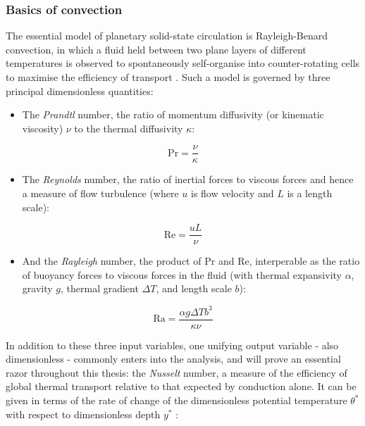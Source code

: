 \documentclass[a4paper,11pt,oneside]{book}
\begin{document}
\subsubsection{Basics of convection}

The essential model of planetary solid-state circulation is Rayleigh-Benard convection, in which a fluid held between two plane layers of different temperatures is observed to spontaneously self-organise into counter-rotating cells to maximise the efficiency of transport \cite{Getling1998-gv}. Such a model is governed by three principal dimensionless quantities:

\begin{itemize}
\item The \textit{Prandtl} number, the ratio of momentum diffusivity (or kinematic viscosity) $\nu$ to the thermal diffusivity $\kappa$:
\end{itemize}

\begin{equation}
\mathrm{Pr} = \frac{\nu}{\kappa}
\end{equation}

\begin{itemize}
\item The \textit{Reynolds} number, the ratio of inertial forces to viscous forces and hence a measure of flow turbulence (where $u$ is flow velocity and $L$ is a length scale):
\end{itemize}

\begin{equation}
\mathrm{Re} =\frac{u L}{\nu}
\end{equation}

\begin{itemize}
\item And the \textit{Rayleigh} number, the product of $\mathrm{Pr}$ and $\mathrm{Re}$, interperable as the ratio of buoyancy forces to viscous forces in the fluid (with thermal expansivity $\alpha$, gravity $g$, thermal gradient $\Delta T$, and length scale $b$):
\end{itemize}

\begin{equation}
\mathrm{Ra} = \frac{\alpha g \Delta T b^3}{\kappa \nu}
\end{equation}

In addition to these three input variables, one unifying output variable - also dimensionless - commonly enters into the analysis, and will prove an essential razor throughout this thesis: the \textit{Nusselt} number, a measure of the efficiency of global thermal transport relative to that expected by conduction alone. It can be given in terms of the rate of change of the dimensionless potential temperature $\theta^*$ with respect to dimensionless depth $y^*$ \cite{Schubert2001-ea}:
\end{document}
